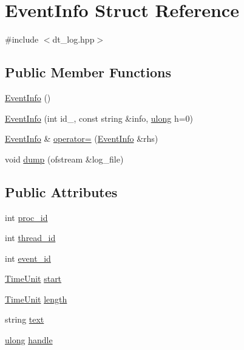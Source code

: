 \hypertarget{struct_event_info}{
\section{EventInfo Struct Reference}
\label{struct_event_info}
}


{\ttfamily \#include $<$dt\_\-log.hpp$>$}\subsection*{Public Member Functions}
\begin{DoxyCompactItemize}
\item 
\hyperlink{struct_event_info_afecb7cc24a3672df223d8b9446211787}{EventInfo} ()
\item 
\hyperlink{struct_event_info_ae707af3cd659bc10776ff7bcb0b1f537}{EventInfo} (int id\_\-, const string \&info, \hyperlink{dt__log_8hpp_a718b4eb2652c286f4d42dc18a8e71a1a}{ulong} h=0)
\item 
\hyperlink{struct_event_info}{EventInfo} \& \hyperlink{struct_event_info_a6a1a924d06fad413aa399c571814d37c}{operator=} (\hyperlink{struct_event_info}{EventInfo} \&rhs)
\item 
void \hyperlink{struct_event_info_a3e4a489eec9f1f7bf9cc9d9fc6c6d8de}{dump} (ofstream \&log\_\-file)
\end{DoxyCompactItemize}
\subsection*{Public Attributes}
\begin{DoxyCompactItemize}
\item 
int \hyperlink{struct_event_info_a65d96a908240a3ac80f295eed7332d81}{proc\_\-id}
\item 
int \hyperlink{struct_event_info_a09d5979b078cc79e25ba12bdb14118a8}{thread\_\-id}
\item 
int \hyperlink{struct_event_info_ab018b649c278ec6f413462ffa631e272}{event\_\-id}
\item 
\hyperlink{basic_8hpp_ac0ec6c8e4757751eaaa618bbf62ab6c9}{TimeUnit} \hyperlink{struct_event_info_a0f8f907ac1f04d3efc98872b902e44c0}{start}
\item 
\hyperlink{basic_8hpp_ac0ec6c8e4757751eaaa618bbf62ab6c9}{TimeUnit} \hyperlink{struct_event_info_a00c0cfb6e7ef3c3568bbe468402d353f}{length}
\item 
string \hyperlink{struct_event_info_a3e78c5448e4dfaaa57fde573ca25a225}{text}
\item 
\hyperlink{dt__log_8hpp_a718b4eb2652c286f4d42dc18a8e71a1a}{ulong} \hyperlink{struct_event_info_a488a554eb65438ca63e7923f74f7f7b7}{handle}
\end{DoxyCompactItemize}


